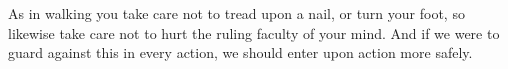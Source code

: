 As in  walking you take care  not to tread upon  a nail, or turn  your foot, so
likewise take care not to hurt the ruling  faculty of your mind. And if we were
to guard against this in every action, we should enter upon action more safely.
